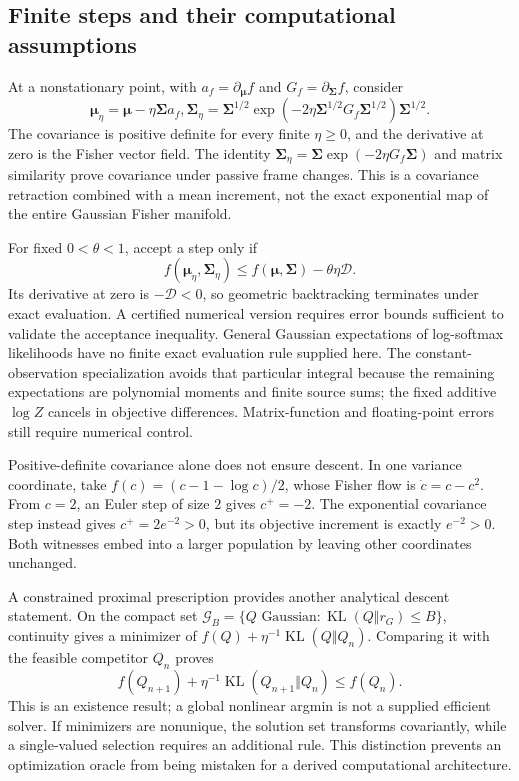\documentclass[11pt]{article}
\newcommand{\KL}{\operatorname{KL}}
\newcommand{\m}{\boldsymbol{\mu}}
\newcommand{\Sig}{\boldsymbol{\Sigma}}
\begin{document}
\subsection{Finite steps and their computational assumptions}

At a nonstationary point, with $a_f=\partial_{\m}f$ and $G_f=\partial_{\Sig}f$, consider
\begin{equation}
\m_\eta=\m-\eta\Sig a_f,
\Sig_\eta=\Sig^{1/2}\exp(-2\eta\Sig^{1/2}G_f\Sig^{1/2})\Sig^{1/2}.
\label{eq:retraction}
\end{equation}
The covariance is positive definite for every finite $\eta\ge0$, and the derivative at zero is the Fisher vector field. The identity $\Sig_\eta=\Sig\exp(-2\eta G_f\Sig)$ and matrix similarity prove covariance under passive frame changes. This is a covariance retraction combined with a mean increment, not the exact exponential map of the entire Gaussian Fisher manifold.

For fixed $0<\theta<1$, accept a step only if
\begin{equation}
f(\m_\eta,\Sig_\eta)\le f(\m,\Sig)-\theta\eta\mathcal D.
\label{eq:armijo}
\end{equation}
Its derivative at zero is $-\mathcal D<0$, so geometric backtracking terminates under exact evaluation. A certified numerical version requires error bounds sufficient to validate the acceptance inequality. General Gaussian expectations of log-softmax likelihoods have no finite exact evaluation rule supplied here. The constant-observation specialization avoids that particular integral because the remaining expectations are polynomial moments and finite source sums; the fixed additive $\log Z$ cancels in objective differences. Matrix-function and floating-point errors still require numerical control.

Positive-definite covariance alone does not ensure descent. In one variance coordinate, take $f(c)=(c-1-\log c)/2$, whose Fisher flow is $\dot c=c-c^2$. From $c=2$, an Euler step of size $2$ gives $c^+=-2$. The exponential covariance step instead gives $c^+=2e^{-2}>0$, but its objective increment is exactly $e^{-2}>0$. Both witnesses embed into a larger population by leaving other coordinates unchanged.

A constrained proximal prescription provides another analytical descent statement. On the compact set $\mathcal G_B=\{Q\text{ Gaussian}:\KL(Q\Vert r_G)\le B\}$, continuity gives a minimizer of $f(Q)+\eta^{-1}\KL(Q\Vert Q_n)$. Comparing it with the feasible competitor $Q_n$ proves
\begin{equation}
f(Q_{n+1})+\eta^{-1}\KL(Q_{n+1}\Vert Q_n)\le f(Q_n).
\label{eq:proximal}
\end{equation}
This is an existence result; a global nonlinear argmin is not a supplied efficient solver. If minimizers are nonunique, the solution set transforms covariantly, while a single-valued selection requires an additional rule. This distinction prevents an optimization oracle from being mistaken for a derived computational architecture.
\end{document}
